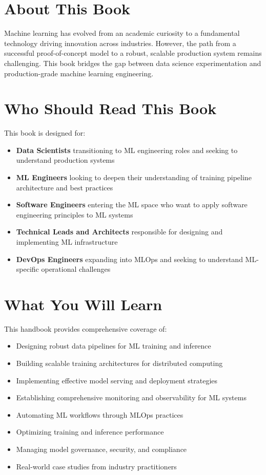 \section*{About This Book}

Machine learning has evolved from an academic curiosity to a fundamental technology driving innovation across industries. However, the path from a successful proof-of-concept model to a robust, scalable production system remains challenging. This book bridges the gap between data science experimentation and production-grade machine learning engineering.

\section*{Who Should Read This Book}

This book is designed for:

\begin{itemize}
    \item \textbf{Data Scientists} transitioning to ML engineering roles and seeking to understand production systems
    \item \textbf{ML Engineers} looking to deepen their understanding of training pipeline architecture and best practices
    \item \textbf{Software Engineers} entering the ML space who want to apply software engineering principles to ML systems
    \item \textbf{Technical Leads and Architects} responsible for designing and implementing ML infrastructure
    \item \textbf{DevOps Engineers} expanding into MLOps and seeking to understand ML-specific operational challenges
\end{itemize}

\section*{What You Will Learn}

This handbook provides comprehensive coverage of:

\begin{itemize}
    \item Designing robust data pipelines for ML training and inference
    \item Building scalable training architectures for distributed computing
    \item Implementing effective model serving and deployment strategies
    \item Establishing comprehensive monitoring and observability for ML systems
    \item Automating ML workflows through MLOps practices
    \item Optimizing training and inference performance
    \item Managing model governance, security, and compliance
    \item Real-world case studies from industry practitioners
\end{itemize}


